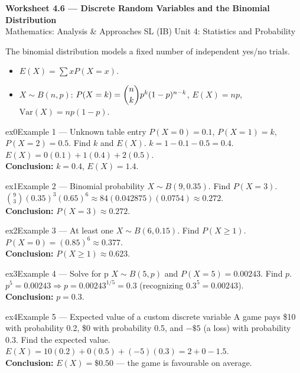 \documentclass[11pt]{article}
\begin{document}
\begin{center}
{\LARGE\bfseries\color{titleblue}Worksheet 4.6 --- Discrete Random Variables and the Binomial Distribution}\\[2pt]
{\small Mathematics: Analysis \& Approaches SL (IB) \textperiodcentered{} Unit 4: Statistics and Probability}
\end{center}

\begin{ideabox}
The binomial distribution models a fixed number of independent yes/no trials.
\begin{itemize}[leftmargin=*,itemsep=2pt]
  \item $E(X)=\sum xP(X=x)$.
  \item $X\sim B(n,p)$: $P(X=k)=\dbinom nk p^k(1-p)^{n-k}$, $E(X)=np$, $\text{Var}(X)=np(1-p)$.
\end{itemize}
\end{ideabox}


\begin{example}{ex0}{Example 1 --- Unknown table entry}
$P(X=0)=0.1$, $P(X=1)=k$, $P(X=2)=0.5$. Find $k$ and $E(X)$.\soln
$k=1-0.1-0.5=0.4$. $E(X)=0(0.1)+1(0.4)+2(0.5)$.\\[3pt]\textbf{Conclusion:} $k=0.4$, $E(X)=1.4$.
\end{example}

\begin{example}{ex1}{Example 2 --- Binomial probability}
$X\sim B(9,0.35)$. Find $P(X=3)$.\soln
$\binom93(0.35)^3(0.65)^6\approx84(0.042875)(0.0754)\approx0.272$.\\[3pt]\textbf{Conclusion:} $P(X=3)\approx0.272$.
\end{example}

\begin{example}{ex2}{Example 3 --- At least one}
$X\sim B(6,0.15)$. Find $P(X\geq1)$.\soln
$P(X=0)=(0.85)^6\approx0.377$.\\[3pt]\textbf{Conclusion:} $P(X\geq1)\approx0.623$.
\end{example}

\begin{example}{ex3}{Example 4 --- Solve for p}
$X\sim B(5,p)$ and $P(X=5)=0.00243$. Find $p$.\soln
$p^5=0.00243\Rightarrow p=0.00243^{1/5}=0.3$ (recognizing $0.3^5=0.00243$).\\[3pt]\textbf{Conclusion:} $p=0.3$.
\end{example}

\begin{example}{ex4}{Example 5 --- Expected value of a custom discrete variable}
A game pays \$10 with probability 0.2, \$0 with probability 0.5, and $-\$5$ (a loss) with probability 0.3. Find the expected value.\soln
$E(X)=10(0.2)+0(0.5)+(-5)(0.3)=2+0-1.5$.\\[3pt]\textbf{Conclusion:} $E(X)=\$0.50$ --- the game is favourable on average.
\end{example}
\end{document}
